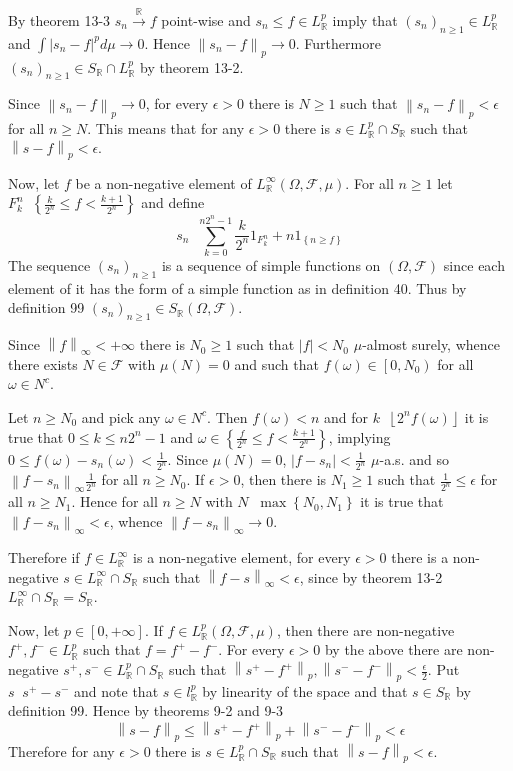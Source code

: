 \documentclass[a4paper]{article}
\newcommand{\obj}[1]{\left\{ #1 \right \}}
\newcommand{\clo}[1]{\left [ #1 \right ]}
\newcommand{\clop}[1]{\left [ #1 \right )}
\newcommand{\brac}[1]{\left ( #1 \right )}
\newcommand{\abs}[1]{\left | #1 \right |}
\newcommand{\nrm}[1]{\left\| #1 \right \|}
\newcommand{\floor}[1]{\left\lfloor #1 \right\rfloor}
\newcommand{\Real}{\mathbb{R}}
\newcommand{\Fcal}{\mathcal{F}}
\newcommand{\defn}{\mathop{\overset{\Delta}{=}}\nolimits}
\begin{document}
By theorem 13-3 $s_n\overset{\Real}{\to}f$ point-wise and $s_n\leq f\in L^p_\Real$ imply that $\brac{s_n}_{n\geq1}\in L^p_\Real$ and $\int \abs{s_n-f}^p d\mu \to 0$. Hence $\nrm{s_n-f}_p\to 0$. Furthermore $\brac{s_n}_{n\geq1}\in S_\Real\cap L^p_\Real$ by theorem 13-2. 

Since $\nrm{s_n-f}_p\to 0$, for every $\epsilon>0$ there is $N\geq1$ such that $\nrm{s_n-f}_p<\epsilon$ for all $n\geq N$. This means that for any $\epsilon>0$ there is $s\in L^p_\Real\cap S_\Real$ such that $\nrm{s-f}_p<\epsilon$.

Now, let $f$ be a non-negative element of $L^\infty_\Real\brac{\Omega,\Fcal,\mu}$. For all $n\geq1$ let $F^n_k\defn \obj{\frac{k}{2^n}\leq f < \frac{k+1}{2^n}}$ and define \[s_n\defn \sum_{k=0}^{n 2^n-1} \frac{k}{2^n} 1_{F^n_k} + n 1_{\obj{n\geq f}}\] The sequence $\brac{s_n}_{n\geq1}$ is a sequence of simple functions on $\brac{\Omega, \Fcal}$ since each element of it has the form of a simple function as in definition 40. Thus by definition 99 $\brac{s_n}_{n\geq1}\in S_\Real\brac{\Omega, \Fcal}$.

Since $\nrm{f}_\infty < +\infty$ there is $N_0\geq1$ such that $\abs{f} < N_0$ $\mu$-almost surely, whence there exists $N\in \Fcal$ with $\mu\brac{N}=0$ and such that $f\brac{\omega}\in\clop{0,N_0}$ for all $\omega\in N^c$.

Let $n\geq N_0$ and pick any $\omega\in N^c$. Then $f\brac{\omega} < n$ and for $k\defn \floor{ 2^n f\brac{\omega} }$ it is true that $0\leq k \leq {n2^n-1}$ and $\omega\in \obj{\frac{f}{2^n}\leq f < \frac{k+1}{2^n}}$, implying $0\leq f\brac{\omega} - s_n\brac{\omega}<\frac{1}{2^n}$. Since $\mu\brac{N}=0$, $\abs{f-s_n}<\frac{1}{2^n}$ $\mu$-a.s. and so $\nrm{f-s_n}_\infty \frac{1}{2^n}$ for all $n\geq N_0$. If $\epsilon>0$, then there is $N_1\geq 1$ such that $\frac{1}{2^n}\leq \epsilon$ for all $n\geq N_1$. Hence for all $n\geq N$ with $N\defn \max\obj{N_0,N_1}$ it is true that $\nrm{f-s_n}_\infty<\epsilon$, whence $\nrm{f-s_n}_\infty \to 0$.

Therefore if $f\in L^\infty_\Real$ is a non-negative element, for every $\epsilon>0$ there is a non-negative $s\in L^\infty_\Real\cap S_\Real$ such that $\nrm{f-s}_\infty < \epsilon$, since by theorem 13-2 $L^\infty_\Real\cap S_\Real=S_\Real$.

Now, let $p\in\clo{0,+\infty}$. If $f\in L^p_\Real\brac{\Omega,\Fcal,\mu}$, then there are non-negative $f^+, f^-\in L^p_\Real$ such that $f=f^+-f^-$. For every $\epsilon>0$ by the above there are non-negative $s^+, s^-\in L^p_\Real\cap S_\Real$ such that $\nrm{s^+ - f^+}_p, \nrm{s^- - f^-}_p < \frac{\epsilon}{2}$. Put $s\defn s^+-s^-$ and note that $s\in l^p_\Real$ by linearity of the space and that $s\in S_\Real$ by definition 99. Hence by theorems 9-2 and 9-3 \[\nrm{s-f}_p\leq \nrm{s^+-f^+}_p + \nrm{s^--f^-}_p < \epsilon\] Therefore for any $\epsilon>0$ there is $s\in L^p_\Real\cap S_\Real$ such that $\nrm{s-f}_p<\epsilon$.
\end{document}
